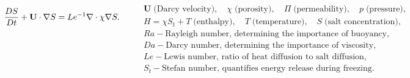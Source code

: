 \documentclass[landscape,24pt, a0paper,colspace=10mm,blockverticalspace=12mm]{tikzposter}
\begin{document}
\begin{columns}
{\begin{minipage}[t]{0.49\linewidth}
    \begin{equation}
\frac{D S}{Dt} + \mathbf{U} \cdot \nabla S = Le^{-1} \nabla \cdot \chi \nabla S.  \label{eq:salt-cons} 
\end{equation} 
\end{minipage}
\hfill
\begin{minipage}[t][][b]{0.48\linewidth}
\begin{align*}
&\mathbf{U}\; \text{(Darcy velocity)}, \quad \chi \; \text{(porosity)}, \quad \Pi \; \text{(permeability)}, \quad p \; \text{(pressure)}, \\
&H = \chi S_t + T \; \text{(enthalpy)},\quad T \; \text{(temperature)}, \quad S \; \text{(salt concentration)}, \\
&Ra - \text{Rayleigh number, determining the importance of buoyancy}, \\
&Da - \text{Darcy number, determining the importance of viscosity}, \\
&Le - \text{Lewis number, ratio of heat diffusion to salt diffusion}, \\
&S_t - \text{Stefan number, quantifies energy release during freezing}.
\end{align*}
\end{minipage}
\fi

}



\end{columns}
\end{document}
